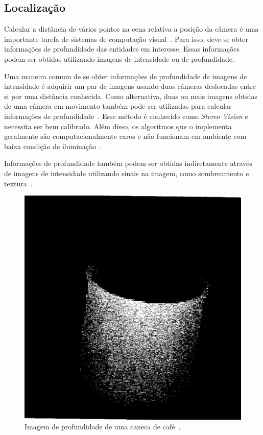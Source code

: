 \subsection{Localização}
\label{sec:luz-estruturada}

	Calcular a distância de vários pontos na cena relativa a posição da câmera é uma importante tarefa de sistemas de computação visual~\cite{jain}. Para isso, deve-se obter informações de profundidade das entidades em interesse. Essas informações podem ser obtidas utilizando imagens de intensidade ou de profundidade.

	Uma maneira comum de se obter informações de profundidade de imagens de intensidade é adquirir um par de imagens usando duas câmeras deslocadas entre si por uma distância conhecida. Como alternativa, duas ou mais imagens obtidas de uma câmera em movimento também pode ser utilizadas para calcular informações de profundidade~\cite{jain}. Esse método é conhecido como \textit{Stereo Vision} e necessita ser bem calibrado.  Além disso, os algoritmos que o implementa geralmente são computacionalmente caros e não funcionam em ambiente com baixa condição de iluminação~\cite{fall-detection}.

	Informações de profundidade também podem ser obtidas indiretamente através de imagens de intensidade utilizando sinais na imagem, como sombreamento e textura~\cite{jain}.

	\begin{figure}[hbt]
		\begin{center}
			\includegraphics[scale=0.3]{figuras/2.FundamentacaoTeorica/depthimage.png}
		\end{center}
		\caption{Imagem de profundidade de uma caneca de café~\cite{jain}.}
		\label{depthimage}
	\end{figure}

